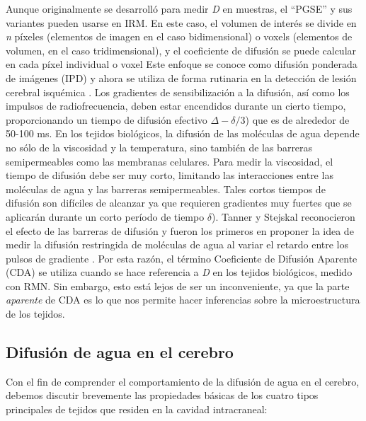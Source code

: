\documentclass[12pt,a5,twoside]{book}
\begin{document}
Aunque originalmente se desarrolló para medir {\it D} en muestras, el ``PGSE'' y sus variantes pueden usarse en IRM. En este caso, el volumen de interés se divide en {\it n} píxeles (elementos de imagen en el caso bidimensional) o voxels (elementos de volumen, en el caso tridimensional), y el coeficiente de difusión se puede calcular en cada píxel individual o voxel Este enfoque se conoce como difusión ponderada de imágenes (IPD) \citep{Wesbey_1984} y ahora se utiliza de forma rutinaria en la detección de lesión cerebral isquémica \citep{Sotak_2002}. Los gradientes de sensibilización a la difusión, así como los impulsos de radiofrecuencia, deben estar encendidos durante un cierto tiempo, proporcionando un tiempo de difusión efectivo $\Delta - \delta/3$) que es de alrededor de 50-100 ms. En los tejidos biológicos, la difusión de las moléculas de agua depende no sólo de la viscosidad y la temperatura, sino también de las barreras semipermeables como las membranas celulares. Para medir la viscosidad, el tiempo de difusión debe ser muy corto, limitando las interacciones entre las moléculas de agua y las barreras semipermeables. Tales cortos tiempos de difusión son difíciles de alcanzar ya que requieren gradientes muy fuertes que se aplicarán durante un corto período de tiempo \(\delta\)). Tanner y Stejskal reconocieron el efecto de las barreras de difusión y fueron los primeros en proponer la idea de medir la difusión restringida de moléculas de agua al variar el retardo entre los pulsos de gradiente \citep{Tanner_1968}. Por esta razón, el término Coeficiente de Difusión Aparente (CDA) se utiliza cuando se hace referencia a {\it D} en los tejidos biológicos, medido con RMN. Sin embargo, esto está lejos de ser un inconveniente, ya que la parte {\it aparente} de CDA es lo que nos permite hacer inferencias sobre la microestructura de los tejidos.

\subsection{Difusión de agua en el cerebro}

Con el fin de comprender el comportamiento de la difusión de agua en el cerebro, debemos discutir brevemente las propiedades básicas de los cuatro tipos principales de tejidos que residen en la cavidad intracraneal:
\end{document}
